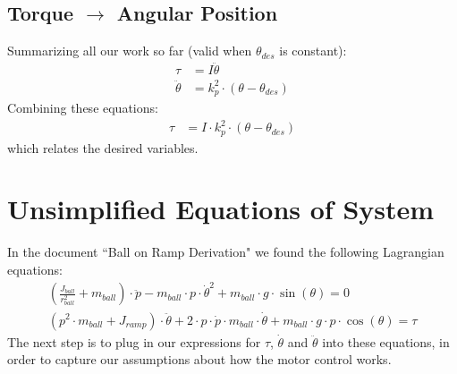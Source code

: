\documentclass[a4paper]{article}
\begin{document}
\subsection*{Torque $\rightarrow$ Angular Position}
Summarizing all our work so far (valid when $\theta_{des}$ is constant):
\begin{align*}
\tau &= I \ddot{\theta} \\
\ddot{\theta} &= k_p^2 \cdot (\theta - \theta_{des})
\end{align*}
Combining these equations:
\begin{align*}
\tau &= I \cdot k_p^2 \cdot (\theta - \theta_{des})
\end{align*}
which relates the desired variables.

\section*{Unsimplified Equations of System}
In the document ``Ball on Ramp Derivation" we found the following Lagrangian equations:
\begin{align*}
\left(\frac{J_{ball}}{r_{ball}^2} + m_{ball} \right) \cdot \ddot{p} - m_{ball} \cdot p \cdot \dot{\theta}^2 + m_{ball} \cdot g \cdot \sin(\theta) = 0 \\
\left(p^2\cdot m_{ball}+ J_{ramp} \right) \cdot \ddot{\theta} + 2 \cdot p \cdot \dot{p} \cdot m_{ball} \cdot \dot{\theta} + m_{ball} \cdot g \cdot p \cdot \cos(\theta) = \tau
\end{align*}
The next step is to plug in our expressions for $\tau$, $\dot{\theta}$ and $\ddot{\theta}$ into these equations, in order to capture our assumptions about how the motor control works. 
\end{document}
